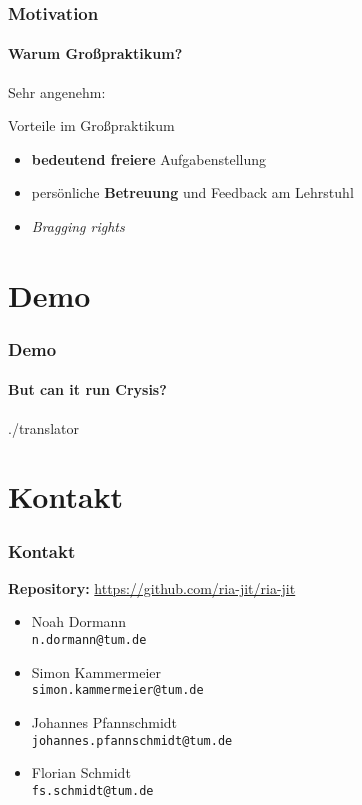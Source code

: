 \documentclass[aspectratio=169, sectionpage=false, german]{tumbeamer}
\newcommand{\blueverb}[1]{{\color{TUMBlue} \texttt{#1}}}
\begin{document}
\begin{frame}
	\frametitle{Motivation}
	\framesubtitle{Warum Großpraktikum?}
	
	Sehr angenehm:
	
	\vspace{0.25cm}
	
	\begin{block}{Vorteile im Großpraktikum}
		\begin{itemize}
			\item \textbf{bedeutend freiere} Aufgabenstellung
			\item persönliche \textbf{Betreuung} und Feedback am Lehrstuhl
			\item \textit{Bragging rights}
		\end{itemize}
	\end{block}
\end{frame}


\section{Demo}
\begin{frame}[c]
	\frametitle{Demo}
	\framesubtitle{But can it run Crysis?}
	\centering\Huge\ttfamily
	./translator
\end{frame}


\section{Kontakt}
\begin{frame}[c]
	\frametitle{Kontakt}
	\textbf{Repository:}\hspace{0.25cm} {\color{TUMBlue}\url{https://github.com/ria-jit/ria-jit}}
	
	\vspace{0.75cm}
	
	\begin{itemize}
		\item Noah Dormann\\\blueverb{n.dormann@tum.de}
		\item Simon Kammermeier\\\blueverb{simon.kammermeier@tum.de}
		\item Johannes Pfannschmidt\\\blueverb{johannes.pfannschmidt@tum.de}
		\item Florian Schmidt\\\blueverb{fs.schmidt@tum.de}
	\end{itemize}
\end{frame}
\end{document}
